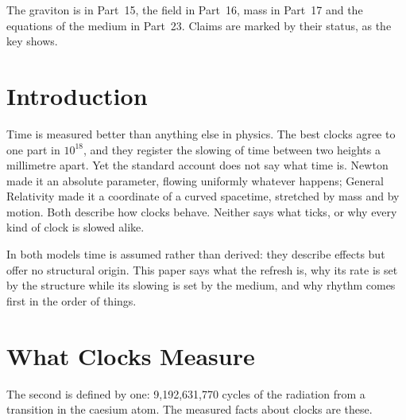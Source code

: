 \documentclass[11pt,a4paper]{article}
\begin{document}
The graviton is in Part~15, the field in Part~16, mass in Part~17 and the equations of the medium in Part~23. Claims are marked by their status, as the key shows.

\statuskey

\section*{Introduction}

Time is measured better than anything else in physics. The best clocks agree to one part in $10^{18}$, and they register the slowing of time between two heights a millimetre apart. Yet the standard account does not say what time is. Newton made it an absolute parameter, flowing uniformly whatever happens; General Relativity made it a coordinate of a curved spacetime, stretched by mass and by motion. Both describe how clocks behave. Neither says what ticks, or why every kind of clock is slowed alike.

In both models time is assumed rather than derived: they describe effects but offer no structural origin.  This paper says what the refresh is, why its rate is set by the structure while its slowing is set by the medium, and why rhythm comes first in the order of things.

\section{What Clocks Measure}
\label{sec:measured}

 The second is defined by one: 9,192,631,770 cycles of the radiation from a transition in the caesium atom. The measured facts about clocks are these.
\end{document}
